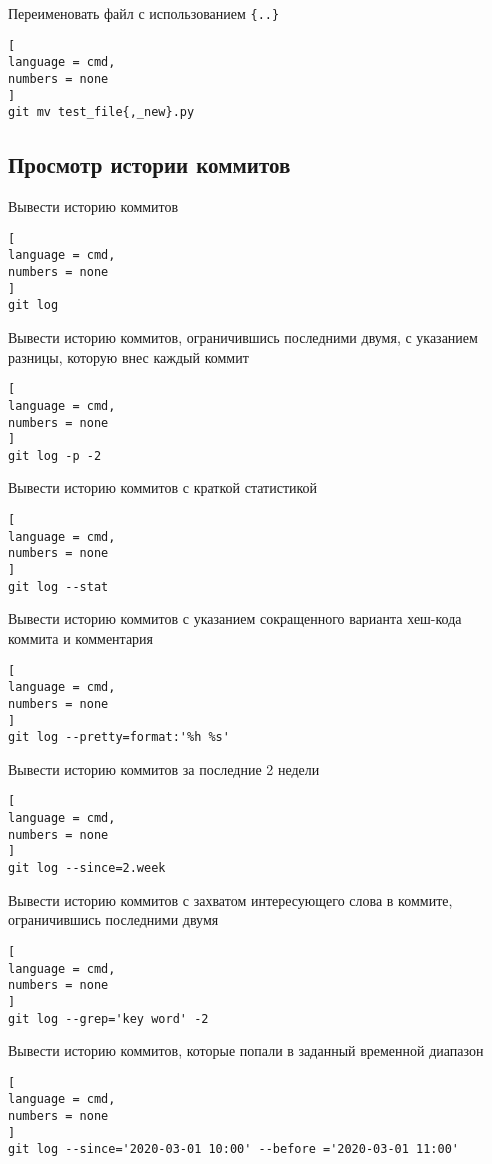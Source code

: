 \documentclass[%
	11pt,
	a4paper,
	utf8,
		]{article}
\begin{document}
Переименовать файл с использованием \texttt{\{..\}}
\begin{lstlisting}[
language = cmd,
numbers = none
]
git mv test_file{,_new}.py
\end{lstlisting}


\subsection{Просмотр истории коммитов}

Вывести историю коммитов

\begin{lstlisting}[
language = cmd,
numbers = none
]
git log
\end{lstlisting}


Вывести историю коммитов, ограничившись последними двумя, с указанием разницы, которую внес каждый коммит

\begin{lstlisting}[
language = cmd,
numbers = none
]
git log -p -2
\end{lstlisting}

Вывести историю коммитов с краткой статистикой

\begin{lstlisting}[
language = cmd,
numbers = none
]
git log --stat
\end{lstlisting}

Вывести историю коммитов с указанием сокращенного варианта хеш-кода коммита и комментария

\begin{lstlisting}[
language = cmd,
numbers = none
]
git log --pretty=format:'%h %s'
\end{lstlisting}


Вывести историю коммитов за последние 2 недели

\begin{lstlisting}[
language = cmd,
numbers = none
]
git log --since=2.week
\end{lstlisting}


Вывести историю коммитов с захватом интересующего слова в коммите, ограничившись последними двумя

\begin{lstlisting}[
language = cmd,
numbers = none
]
git log --grep='key word' -2
\end{lstlisting}


Вывести историю коммитов, которые попали в заданный временной диапазон

\begin{lstlisting}[
language = cmd,
numbers = none
]
git log --since='2020-03-01 10:00' --before ='2020-03-01 11:00'
\end{lstlisting}
\end{document}
